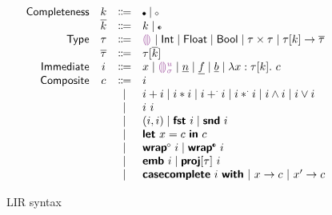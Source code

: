 \documentclass[index.tex]{subfiles}
\begin{document}
\begin{figure}[htb!]
  \[\begin{array}{rccl}
    \NKMName & \NKMV & \Coloneqq & \KNC \mid \KNI \\
    \KMName  & \KMV  & \Coloneqq & \NKMV \mid \KII \\
    \TCMName    & \TCMV    & \Coloneqq & \TCHole \mid \TCInt \mid \TCFloat \mid \TCBool 
                                                   \mid \TCPair{\TCMV}{\TCMV} 
                                                   \mid \TCFun{\TMk{\TCMV}{\NKMV}}{\TMV} \\
    \TMName       & \TMV       & \Coloneqq & \TMk{\TCMV}{\KMV} \\
    \IMName       & \IMV       & \Coloneqq & x \mid \IEHole{\HIMV}{\HEMV}
                                                   \mid \IIntMV \mid \IFloatMV \mid \IBoolMV 
                                                   \mid \CLam{x}{\TMk{\TCMV}{\NKMV}}{\CMV} \\
    \CMName      & \CMV      & \Coloneqq & \IMV \\
                   &                   & \mid         & \CPlus{\IMV}{\IMV} 
                                                   \mid \CTimes{\IMV}{\IMV}
                                                   \mid \CFPlus{\IMV}{\IMV} 
                                                   \mid \CFTimes{\IMV}{\IMV}
                                                   \mid \CAnd{\IMV}{\IMV}
                                                   \mid \COr{\IMV}{\IMV} \\
                   &                   & \mid         & \CAp{\IMV}{\IMV} \\
                   &                   & \mid         & \CPair{\IMV}{\IMV}
                                                   \mid \CProjL{\IMV}
                                                   \mid \CProjR{\IMV} \\
                   &                   & \mid         & \CLet{x}{\CMV} \CInWith{\CMV} \\
                   &                   & \mid         & \CWrapIntoNI{\IMV}
                                                   \mid \CWrapIntoII{\IMV} \\
                   &                   & \mid         & \CEmbed{\IMV}
                                                   \mid \CProj{\IMV}{\TCMV} \\
                   &                   & \mid         & \CCaseCompleteWith{\IMV}
                                                    ~\CCaseCompleteBr{x}{\CMV}
                                                    ~\CCaseCompleteBr{x'}{\CMV}
  \end{array}\]
  \caption{LIR syntax}
  \label{fig:lir-syntax}
\end{figure}
\end{document}
